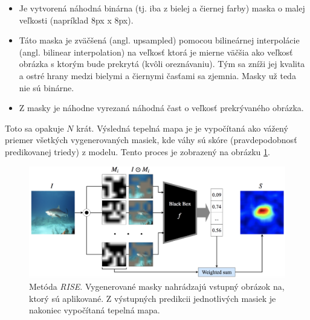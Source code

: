 \begin{itemize}
    \item Je vytvorená náhodná binárna (tj. iba z bielej a čiernej farby) maska o malej veľkosti (napríklad 8px x 8px).
    \item Táto maska je zväčšená (angl. upsampled) pomocou bilineárnej interpolácie \cite{petsiuk2018rise} (angl. bilinear interpolation) na veľkosť ktorá je mierne väčšia ako veľkosť obrázka s ktorým bude prekrytá (kvôli oreznávaniu). Tým sa zníži jej kvalita a ostré hrany medzi bielymi a čiernymi časťami sa zjemnia. Masky už teda nie sú binárne.
    \item Z masky je náhodne vyrezaná náhodná čast o veľkosť prekrývaného obrázka.
\end{itemize}


Toto sa opakuje $N$ krát. Výsledná tepelná mapa je je vypočítaná ako vážený priemer všetkých vygenerovaných masiek, kde váhy sú skóre (pravdepodobnosť predikovanej triedy) z modelu. Tento proces je zobrazený na obrázku \ref{fig:rise_architecture}.

\begin{figure}[h!]
    \centering
    \includegraphics[scale=0.35]{assets/images/rise_architecture.png}
    \caption{Metóda \textit{RISE}. \cite{petsiuk2018rise} Vygenerované masky nahrádzajú vstupný obrázok na, ktorý sú aplikované. Z výstupných predikcii jednotlivých masiek je nakoniec vypočítaná tepelná mapa.}
    \label{fig:rise_architecture}
\end{figure}

